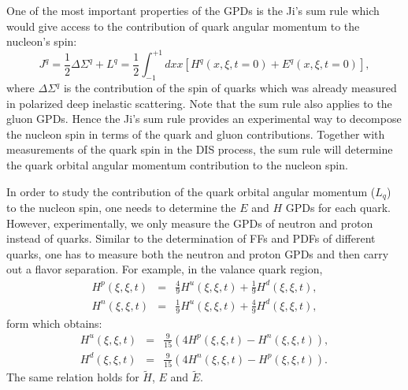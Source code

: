 One of the most important properties of the GPDs is the Ji's sum rule which would give access to the contribution of quark angular momentum to the nucleon's spin:
\begin{equation}
  J^{q}=\frac{1}{2}\Delta\Sigma^{q}+L^{q}=\frac{1}{2}\int_{-1}^{+1}dx x [H^{q}(x,\xi,t=0)+E^{q}(x,\xi,t=0)],
\end{equation}
where $\Delta\Sigma^{q}$  is the contribution of the spin of quarks which was already measured in polarized deep inelastic scattering. Note that the sum rule also applies to the gluon GPDs. Hence the Ji's sum rule provides an experimental way to decompose the nucleon spin in terms of the quark and gluon contributions. Together with measurements of the quark spin in the DIS process, the sum rule will determine the quark orbital angular momentum contribution to the nucleon spin.

In order to study the contribution of the quark orbital angular momentum ($L_{q}$) to the nucleon spin, one needs to determine the $E$ and $H$ GPDs for each quark. However, experimentally, we only measure the GPDs of neutron and proton instead of quarks. Similar to the determination of FFs and PDFs of different quarks, one has to measure both the neutron and proton GPDs and then carry out a flavor separation. For example, in the valance quark region,
\begin{eqnarray}
    H^{p}(\xi,\xi,t)&=&\frac{4}{9}  H^{u}(\xi,\xi,t)+\frac{1}{9}  H^{d}(\xi,\xi,t),\\
    H^{n}(\xi,\xi,t)&=&\frac{1}{9}  H^{u}(\xi,\xi,t)+\frac{4}{9}  H^{d}(\xi,\xi,t),
\end{eqnarray}
form which obtains:
\begin{eqnarray}
    H^{u}(\xi,\xi,t)&=&\frac{9}{15} (4 H^{p}(\xi,\xi,t) - H^{n}(\xi,\xi,t)),\\
    H^{d}(\xi,\xi,t)&=&\frac{9}{15} (4 H^{n}(\xi,\xi,t) - H^{p}(\xi,\xi,t)).
\end{eqnarray}
The same relation holds for $\tilde H$, $E$ and $\tilde E$.

